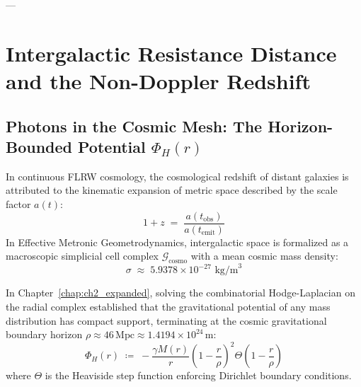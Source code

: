 \documentclass[
    12pt,
    a4paper,
    headings=normal,
    twoside=false,
    open=any,
    parskip=half
]{scrbook}
\begin{document}
---

\section{Intergalactic Resistance Distance and the Non-Doppler Redshift}
\label{sec:ch7_bellert_redshift}

\subsection{Photons in the Cosmic Mesh: The Horizon-Bounded Potential $\Phi_H(r)$}

In continuous FLRW cosmology, the cosmological redshift of distant galaxies is attributed to the kinematic expansion of metric space described by the scale factor $a(t)$:
\begin{equation}
1 + z \;=\; \frac{a(t_{\text{obs}})}{a(t_{\text{emit}})}
\end{equation}
In Effective Metronic Geometrodynamics, intergalactic space is formalized as a macroscopic simplicial cell complex $\mathcal{G}_{\text{cosmo}}$ with a mean cosmic mass density:
\begin{equation}
\sigma \;\approx\; 5.9378 \times 10^{-27} \text{ kg/m}^3
\label{eq:ch7_mean_density}
\end{equation}

In Chapter~\ref{chap:ch2_expanded}, solving the combinatorial Hodge-Laplacian on the radial complex established that the gravitational potential of any mass distribution has compact support, terminating at the cosmic gravitational boundary horizon $\rho \approx 46\,\text{Mpc} \approx 1.4194 \times 10^{24}\,\text{m}$:
\begin{equation}
\Phi_H(r) \;\coloneqq\; -\frac{\gamma M(r)}{r} \left( 1 - \frac{r}{\rho} \right)^2 \Theta\left( 1 - \frac{r}{\rho} \right)
\label{eq:ch7_extended_potential_recap}
\end{equation}
where $\Theta$ is the Heaviside step function enforcing Dirichlet boundary conditions.
\end{document}
